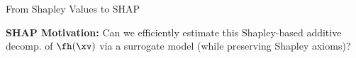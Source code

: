 \documentclass[10pt,compress,t,notes=noshow, xcolor=table]{beamer}
\begin{document}
\begin{framev}[align=top]{From Shapley Values to SHAP}

\textbf{SHAP Motivation:}
Can we efficiently estimate this Shapley-based additive decomp. of $\fh(\xv)$ via a surrogate model (while preserving Shapley axioms)?
\end{framev}



% 
% 
% 
% 
\end{document}
